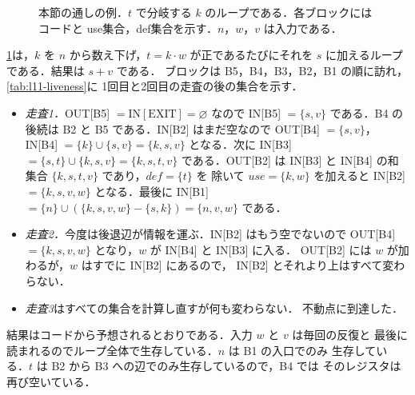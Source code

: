 \documentclass[../main.tex]{subfiles}
\begin{document}
\begin{figure}[tb]
  \centering
  
  \caption{本節の通しの例．$t$ で分岐する $k$ のループである．各ブロックには
    コードと use集合，def集合を示す．$n$，$w$，$v$ は入力である．}
  \label{fig:l11-liveness-cfg}
\end{figure}

\begin{example}
  \label{ex:l11-liveness}
  \cref{fig:l11-liveness-cfg}は，$k$ を $n$ から数え下げ，$t = k\cdot w$
  が正であるたびにそれを $s$ に加えるループである．結果は $s + v$ である．
  ブロックは B5，B4，B3，B2，B1 の順に訪れ，\cref{tab:l11-liveness}に
  1回目と2回目の走査の後の集合を示す．
  \begin{itemize}
    \item \emph{走査1．}OUT[B5] $= \mathrm{IN}[\mathrm{EXIT}] =
      \varnothing$ なので IN[B5] $= \{s,v\}$ である．B4 の後続は B2 と
      B5 である．IN[B2] はまだ空なので OUT[B4] $= \{s,v\}$，
      IN[B4] $= \{k\} \cup \{s,v\} = \{k,s,v\}$ となる．次に IN[B3] $=
      \{s,t\} \cup \{k,s,v\} = \{k,s,t,v\}$ である．OUT[B2] は IN[B3] と
      IN[B4] の和集合 $\{k,s,t,v\}$ であり，$\mathit{def} = \{t\}$ を
      除いて $\mathit{use} = \{k,w\}$ を加えると IN[B2] $=
      \{k,s,v,w\}$ となる．最後に IN[B1] $= \{n\} \cup (\{k,s,v,w\} -
      \{s,k\}) = \{n,v,w\}$ である．
    \item \emph{走査2．}今度は後退辺が情報を運ぶ．IN[B2] はもう空でないので
      OUT[B4] $= \{k,s,v,w\}$ となり，$w$ が IN[B4] と IN[B3] に入る．
      OUT[B2] には $w$ が加わるが，$w$ はすでに IN[B2] にあるので，
      IN[B2] とそれより上はすべて変わらない．
    \item \emph{走査3}はすべての集合を計算し直すが何も変わらない．
      不動点に到達した．
  \end{itemize}
  結果はコードから予想されるとおりである．入力 $w$ と $v$ は毎回の反復と
  最後に読まれるのでループ全体で生存している．$n$ は B1 の入口でのみ
  生存している．$t$ は B2 から B3 への辺でのみ生存しているので，B4 では
  そのレジスタは再び空いている．
\end{example}
\end{document}

